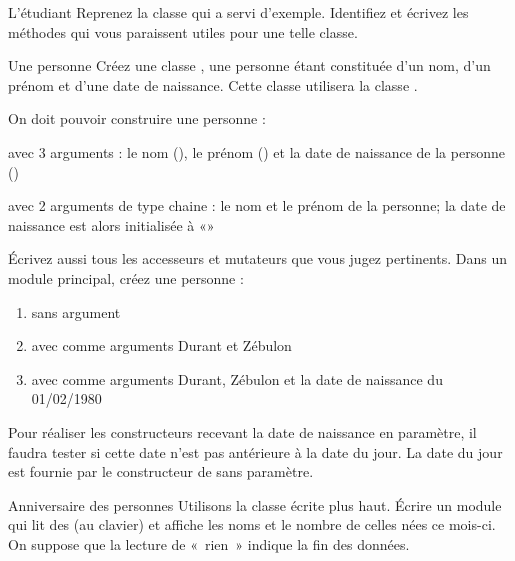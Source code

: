\begin{Exercice}{L'étudiant}
	Reprenez la classe  qui a servi
	d'exemple. Identifiez et écrivez les méthodes qui vous
	paraissent utiles pour une telle classe.
\end{Exercice}

\begin{Exercice}{Une personne}
	Créez une classe , une personne étant
	constituée d'un nom, d'un prénom et
	d'une date de naissance. Cette classe utilisera la
	classe .

	On doit pouvoir construire une personne :

	\begin{liste}
		\item 
			avec 3 arguments : le nom (), le prénom
			() et la date de naissance de la personne
			()
		\item 
			avec 2 arguments de type chaine : le nom et le prénom de la personne; la
			date de naissance est alors initialisée à «»
	\end{liste}

	Écrivez aussi tous les accesseurs et mutateurs que vous jugez
	pertinents. Dans un module principal, créez une personne :

	\begin{enumerate}[label=\alph*)]
		\item 
			sans argument
		\item 
			avec comme arguments {\textquotedbl}Durant{\textquotedbl} et
			{\textquotedbl}Zébulon{\textquotedbl}
		\item 
			avec comme arguments {\textquotedbl}Durant{\textquotedbl},
			{\textquotedbl}Zébulon{\textquotedbl} et la date de naissance du
			01/02/1980
	\end{enumerate}

	Pour réaliser les constructeurs recevant la date de naissance en
	paramètre, il faudra tester si cette date n’est pas antérieure à la
	date du jour. La date du jour est fournie par le constructeur de
	 sans paramètre.
\end{Exercice}

\begin{Exercice}{Anniversaire des personnes}
	Utilisons la classe  écrite plus haut.
	Écrire un module qui lit des  (au clavier)
	et affiche les noms et le nombre de celles nées ce mois-ci. On suppose
	que la lecture de «~rien~» indique la fin des données.
\end{Exercice}

